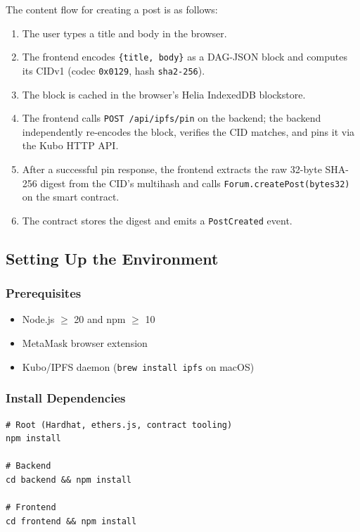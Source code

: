 \documentclass[11pt]{article}
\begin{document}
The content flow for creating a post is as follows:
\begin{enumerate}
  \item The user types a title and body in the browser.
  \item The frontend encodes \texttt{\{title, body\}} as a DAG-JSON block and computes its CIDv1 (codec \texttt{0x0129}, hash \texttt{sha2-256}).
  \item The block is cached in the browser's Helia IndexedDB blockstore.
  \item The frontend calls \texttt{POST /api/ipfs/pin} on the backend; the backend independently re-encodes the block, verifies the CID matches, and pins it via the Kubo HTTP API.
  \item After a successful pin response, the frontend extracts the raw 32-byte SHA-256 digest from the CID's multihash and calls \texttt{Forum.createPost(bytes32)} on the smart contract.
  \item The contract stores the digest and emits a \texttt{PostCreated} event.
\end{enumerate}

\subsection{Setting Up the Environment}

\subsubsection{Prerequisites}

\begin{itemize}
  \item Node.js $\geq$ 20 and npm $\geq$ 10
  \item MetaMask browser extension
  \item Kubo/IPFS daemon (\texttt{brew install ipfs} on macOS)
\end{itemize}

\subsubsection{Install Dependencies}

\begin{lstlisting}[style=command]
# Root (Hardhat, ethers.js, contract tooling)
npm install

# Backend
cd backend && npm install

# Frontend
cd frontend && npm install
\end{lstlisting}
\end{document}
